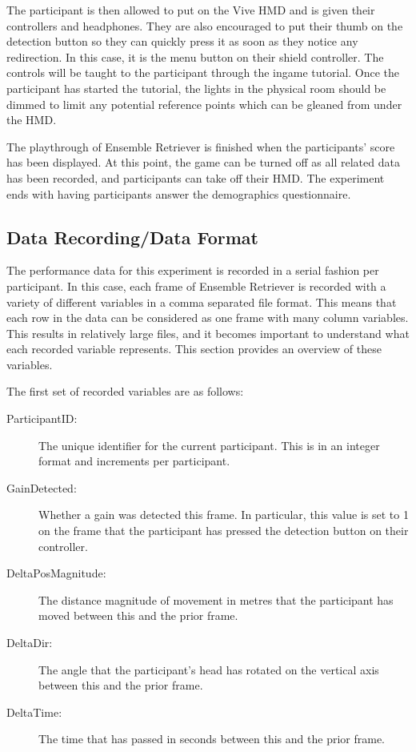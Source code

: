 The participant is then allowed to put on the Vive HMD and is given their controllers and headphones. They are also encouraged to put their thumb on the detection button so they can quickly press it as soon as they notice any redirection. In this case, it is the menu button on their shield controller. The controls will be taught to the participant through the ingame tutorial. Once the participant has started the tutorial, the lights in the physical room should be dimmed to limit any potential reference points which can be gleaned from under the HMD.

The playthrough of Ensemble Retriever is finished when the participants' score has been displayed. At this point, the game can be turned off as all related data has been recorded, and participants can take off their HMD. The experiment ends with having participants answer the demographics questionnaire. 

\subsection{Data Recording/Data Format}\label{sec:ex1dataformat}
The performance data for this experiment is recorded in a serial fashion per participant. In this case, each frame of Ensemble Retriever is recorded with a variety of different variables in a comma separated file format. This means that each row in the data can be considered as one frame with many column variables. This results in relatively large files, and it becomes important to understand what each recorded variable represents. This section provides an overview of these variables.

The first set of recorded variables are as follows:
\begin{description}
   \item[ParticipantID:] The unique identifier for the current participant. This is in an integer format and increments per participant. 
   \item[GainDetected:] Whether a gain was detected this frame. In particular, this value is set to 1 on the frame that the participant has pressed the detection button on their controller. 
   \item[DeltaPosMagnitude:] The distance magnitude of movement in metres that the participant has moved between this and the prior frame. 
   \item[DeltaDir:] The angle that the participant's head has rotated on the vertical axis between this and the prior frame. 
   \item[DeltaTime:] The time that has passed in seconds between this and the prior frame. 
\end{description}


